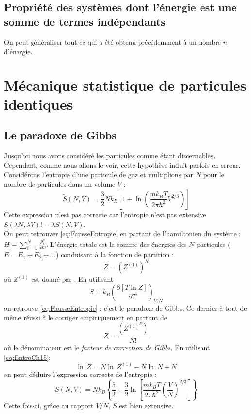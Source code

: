 \documentclass[british,french,11pt, a4paper, openany]{book}
\begin{document}
\section{Propriété des systèmes dont l'énergie est une somme de termes indépendants}
On peut généraliser tout ce qui a été obtenu précédemment à un nombre $n$ d'énergie.










\chapter{Mécanique statistique de particules identiques}
\section{Le paradoxe de Gibbs}
Jusqu'ici nous avons considéré les particules comme étant discernables. Cependant, comme 
nous allons le voir, cette hypothèse induit parfois en erreur. Considérons l'entropie d'une
particule de gaz et multiplions par $N$ pour le nombre de particules dans un volume $V$ :
\begin{equation}
	\tilde{S}(N,V) = \frac{3}{2}Nk_B\left[1+\ln\left(\dfrac{mk_BT}{2\pi\hbar^2}V^{2/3}\right)\right]
	\label{eq:FausseEntropie}
\end{equation}
Cette expression n'est pas correcte car l'entropie n'est pas extensive $S(\lambda N,\lambda V) != \lambda S(N,V)$.\\
On peut retrouver \autoref{eq:FausseEntropie} en partant de l'hamiltonien du système : 
$H = \sum_{i=1}^N \frac{p_i^2}{2m}$. L'énergie totale est la somme des énergies des $N$ particules
($E = E_1 + E_2 + \dots$) conduisant à la fonction de partition :
\begin{equation}
	\tilde{Z} = (Z^{(1)})^N
\end{equation}
où $Z^{(1)}$ est donné par \label{eq:z1}. En utilisant 
\begin{equation}
	S = k_B\left(\dfrac{\partial [T\ln Z]}{\partial T}\right)_{V,N}
	\label{eq:EntroCh15}
\end{equation}
on retrouve \autoref{eq:FausseEntropie} : c'est le paradoxe de Gibbs. Ce dernier à tout  de 
même réussi à le corriger empiriquement en partant de
\begin{equation}
	Z = \dfrac{(Z^{(1)^N})}{N!}
\end{equation}
où le dénominateur est le \textit{facteur de correction de Gibbs.} En utilisant \autoref{eq:EntroCh15}:
\begin{equation}
	\ln\ Z = N\ln\ Z^{(1)} - N\ln\ N + N
\end{equation}
on peut déduire l'expression correcte de l'entropie :
\begin{equation}
	S(N,V) = Nk_B\left\{\dfrac{5}{2}+\dfrac{3}{2}\ln\left[\dfrac{mk_BT}{2\pi\hbar^2}\left(\dfrac{V}{N}
	\right)^{2/3}\right]\right\}
\end{equation}
Cette fois-ci, grâce au rapport $V/N$, $S$ est bien extensive.
\end{document}
